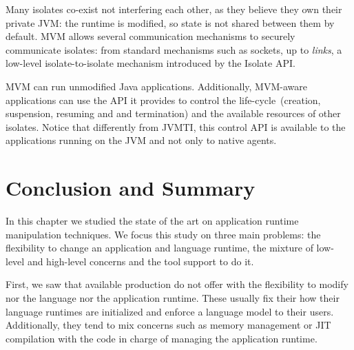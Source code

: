 Many isolates co-exist not interfering each other, as they believe they own their private JVM: the runtime is modified, so state is not shared between them by default. MVM allows several communication mechanisms to securely communicate isolates: from standard mechanisms such as sockets, up to \emph{links}, a low-level isolate-to-isolate mechanism introduced by the Isolate API.

MVM can run unmodified Java applications. Additionally, MVM-aware applications can use the API it provides to control the life-cycle~(\eg creation, suspension, resuming and and termination) and the available resources of other isolates. Notice that differently from JVMTI, this control API is available to the applications running on the JVM and not only to native agents.



\section{Conclusion and Summary}

In this chapter we studied the state of the art on application runtime manipulation techniques. We focus this study on three main problems: the flexibility to change an application and language runtime, the mixture of low-level and high-level concerns and the tool support to do it.

First, we saw that available production \VMs do not offer with the flexibility to modify nor the language nor the application runtime. These \VMs usually fix their how their language runtimes are initialized and enforce a language model to their users. Additionally, they tend to mix \VM concerns such as memory management or JIT compilation with the code in charge of managing the application runtime.


